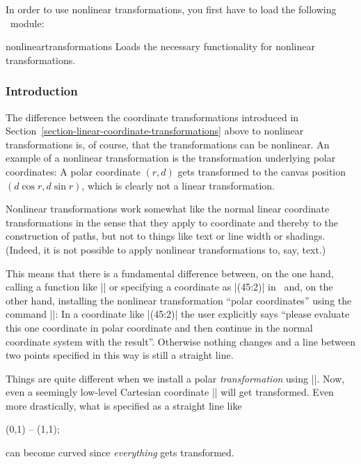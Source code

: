 In order to use nonlinear transformations, you first have to load the following
\pgfname\ module:

\begin{pgfmodule}{nonlineartransformations}
    Loads the necessary functionality for nonlinear transformations.
\end{pgfmodule}


\subsubsection{Introduction}

The difference between the coordinate transformations introduced in
Section~\ref{section-linear-coordinate-transformations} above to nonlinear
transformations is, of course, that the transformations can be nonlinear. An
example of a nonlinear transformation is the transformation underlying polar
coordinates: A polar coordinate $(r,d)$ gets transformed to the canvas position
$(d\cos r,d\sin r)$, which is clearly not a linear transformation.

Nonlinear transformations work somewhat like the normal linear coordinate
transformations in the sense that they apply to coordinate and thereby to the
construction of paths, but not to things like text or line width or shadings.
(Indeed, it is not possible to apply nonlinear transformations to, say, text.)

This means that there is a fundamental difference between, on the one hand,
calling a function like |\pgfpointpolar| or specifying a coordinate as |(45:2)|
in \tikzname\ and, on the other hand, installing the nonlinear transformation
``polar coordinates'' using the command |\pgftransformnonlinear|: In a
coordinate like |(45:2)| the user explicitly says ``please evaluate this one
coordinate in polar coordinate and then continue in the normal coordinate
system with the result''. Otherwise nothing changes and a line between two
points specified in this way is still a straight line.

Things are quite different when we install a polar \emph{transformation} using
|\pgftransformnonlinear|. Now, even a seemingly low-level Cartesian coordinate
|\pgfqpoint{1pt}{1pt}| will get transformed. Even more drastically, what is
specified as a straight line like
%
\begin{codeexample}
\draw (0,1) -- (1,1);
\end{codeexample}
%
can become curved since \emph{everything} gets transformed.



